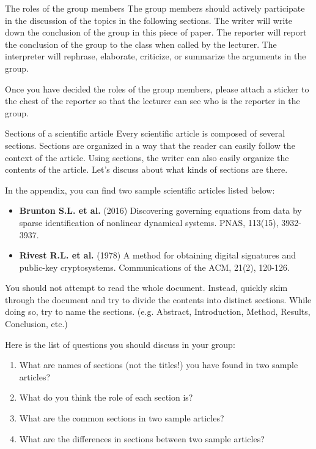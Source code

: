 \documentclass{beamer}
\begin{document}
\begin{frame}{The roles of the group members}
The group members should actively participate in the discussion of the topics in the following sections.
The writer will write down the conclusion of the group in this piece of paper.
The reporter will report the conclusion of the group to the class when called by the lecturer.
The interpreter will rephrase, elaborate, criticize, or summarize the arguments in the group.

Once you have decided the roles of the group members, please attach a sticker to the chest of the reporter so that the lecturer can see who is the reporter in the group.
\end{frame}

\begin{frame}{Sections of a scientific article}
Every scientific article is composed of several sections.
Sections are organized in a way that the reader can easily follow the context of the article.
Using sections, the writer can also easily organize the contents of the article.
Let's discuss about what kinds of sections are there.
\end{frame}

\begin{frame}
In the appendix, you can find two sample scientific articles listed below:
\begin{itemize}
    \item \textbf{Brunton S.L. et al.} (2016) Discovering governing equations from data by sparse identification of nonlinear dynamical systems. PNAS, 113(15), 3932-3937.
    \item \textbf{Rivest R.L. et al.} (1978) A method for obtaining digital signatures and public-key cryptosystems. Communications of the ACM, 21(2), 120-126.
\end{itemize}
You should not attempt to read the whole document.
Instead, quickly skim through the document and try to divide the contents into distinct sections.
While doing so, try to name the sections. (e.g. Abstract, Introduction, Method, Results, Conclusion, etc.) 
\end{frame}

\begin{frame}
Here is the list of questions you should discuss in your group:
\begin{enumerate}
    \item What are names of sections (not the titles!) you have found in two sample articles? 
    \item What do you think the role of each section is?
    \item What are the common sections in two sample articles?
    \item What are the differences in sections between two sample articles?
\end{enumerate}
\end{frame}
\end{document}
